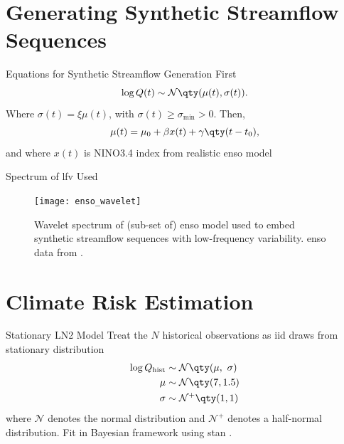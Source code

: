 \documentclass[
  10pt,     %
]{beamer}
\newcommand{\normal}{\mathcal{N}}
\begin{document}
\section{Generating Synthetic Streamflow Sequences}

\begin{frame}{Equations for Synthetic Streamflow Generation}
  First
  \begin{equation} \label{eq:lognormal}
    \log Q(t) \sim \normal \qty(\mu(t), \sigma(t)).
  \end{equation}
  Where $\sigma(t) = \xi \mu(t)$, with $\sigma(t) \geq \sigma_\text{min} > 0$.
  Then,
  \begin{equation}\label{eq:nino3}
    \mu(t) = \mu_0 + \beta x(t) + \gamma \qty(t - t_0),
  \end{equation}
  and where $x(t)$ is NINO3.4 index from realistic \gls{enso} model \citep{Zebiak:1987cl,Ramesh:2016hf}
\end{frame}

\begin{frame}{Spectrum of \gls{lfv} Used}
  \begin{figure}
    \texttt{[image: enso\_wavelet]}
    \caption{
      Wavelet spectrum of (sub-set of) \gls{enso} model used to embed synthetic streamflow sequences with low-frequency variability.
      \gls{enso} data from \citet{Ramesh:2016hf}.
    }
  \end{figure}
\end{frame}

\section{Climate Risk Estimation}

\begin{frame}{Stationary LN2 Model}
  Treat the $N$ historical observations as \gls{iid} draws from stationary distribution
  \begin{align}\label{eq:ln2-stationary}
    \begin{split}
      \log Q_\text{hist} & \sim \normal \qty(\mu, \ \sigma) \\
      \mu &\sim \normal \qty(7, 1.5) \\
      \sigma &\sim \normal^+ \qty(1, 1)
    \end{split}
  \end{align}
  where $\normal$ denotes the normal distribution and $\normal^+$ denotes a half-normal distribution.
  Fit in Bayesian framework using stan \citep{Carpenter:2017ke}.
\end{frame}
\end{document}

